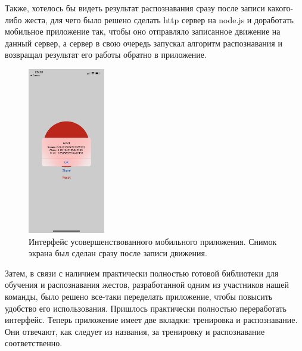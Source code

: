 Также, хотелось бы видеть результат распознавания сразу после записи какого-либо жеста, для чего было решено сделать http сервер на node.js и доработать мобильное приложение так, чтобы оно отправляло записанное движение на данный сервер, а сервер в свою очередь запускал алгоритм распознавания и возвращал результат его работы обратно в приложение.


\begin{figure}[H]
    \begin{center}
        \includegraphics[width=0.3\textwidth]{max_kt2_images/image5.jpg}
    \end{center}
    \caption{Интерфейс усовершенствованного мобильного приложения. Снимок экрана был сделан сразу после записи движения.}
\end{figure}

Затем, в связи с наличием практически полностью готовой библиотеки для обучения и распознавания жестов, разработанной одним из участников нашей команды, было решено все-таки переделать приложение, чтобы повысить удобство его использования. Пришлось практически полностью переработать интерфейс. Теперь приложение имеет две вкладки: тренировка и распознавание. Они отвечают, как следует из названия, за тренировку и распознавание соответственно.

